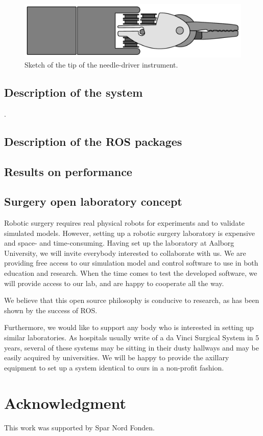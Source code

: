 \documentclass[a4paper, 10 pt, conference]{ieeeconf}      %
\begin{document}
\begin{figure}[t]
    \centering
       \includegraphics[width=0.8\linewidth]{graphics/Needle-driver_conceptual.pdf}
    \caption{Sketch of the tip of the needle-driver instrument. \label{fig:gripper_tip}}
\end{figure}

\subsection{Description of the system}.

\subsection{Description of the ROS packages}

\subsection{Results on performance}

\subsection{Surgery open laboratory concept}
Robotic surgery requires real physical robots for experiments and to validate simulated models.
However, setting up a robotic surgery laboratory is expensive and space- and time-consuming.
Having set up the laboratory at Aalborg University, we will invite everybody interested to collaborate with us.
We are providing free access to our simulation model and control software to use in both education and research.
When the time comes to test the developed software, we will provide access to our lab, and are happy to cooperate all the way.

We believe that this open source philosophy is conducive to research, as has been shown by the success of ROS.

Furthermore, we would like to support any body who is interested in setting up similar laboratories.
As hospitals usually write of a da Vinci Surgical System in 5 years, several of these systems may be sitting in their dusty hallways and may be easily acquired by universities.
We will be happy to provide the axillary equipment to set up a system identical to ours in a non-profit fashion.

\section*{Acknowledgment}
This work was supported by Spar Nord Fonden.



\end{document}
